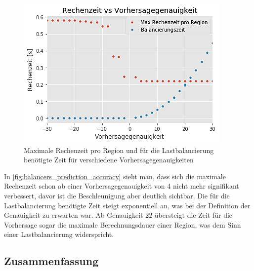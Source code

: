 \begin{figure}
	\centering
	\includegraphics[width=0.9\linewidth]{img/Evaluation/balancers/prediction_accuracy_32.png}
	\caption{Maximale Rechenzeit pro Region und für die Lastbalancierung benötigte Zeit für verschiedene Vorhersagegenauigkeiten}
	\label{fig:balancers_prediction_accuracy}
\end{figure}

In \autoref{fig:balancers_prediction_accuracy} sieht man, dass sich die maximale Rechenzeit schon ab einer Vorhersagegenauigkeit von 4 nicht mehr signifikant verbessert, davor ist die Beschleunigung aber deutlich sichtbar.
Die für die Lastbalancierung benötigte Zeit steigt exponentiell an, was bei der Definition der Genauigkeit zu erwarten war.
Ab Genauigkeit 22 übersteigt die Zeit für die Vorhersage sogar die maximale Berechnungsdauer einer Region, was dem Sinn einer Lastbalancierung widerspricht.

%

\subsection{Zusammenfassung}
